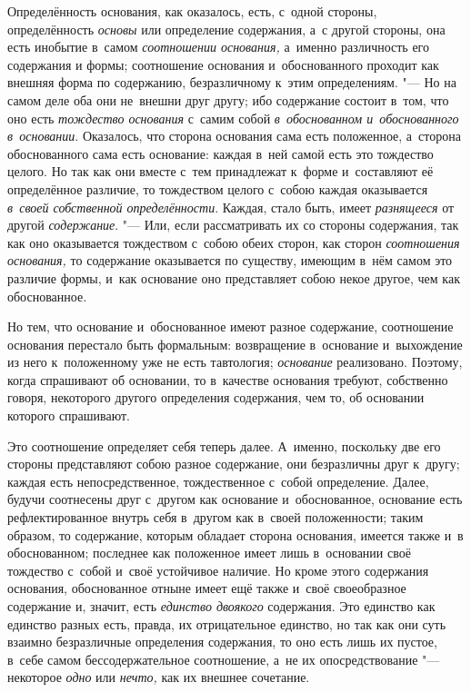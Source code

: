 
Определённость основания, как оказалось, есть, с~одной стороны, определённость
{\em основы} или определение содержания, а~с другой стороны, она есть инобытие
в~самом {\em соотношении основания,} а~именно различность его содержания и
формы; соотношение основания и~обоснованного проходит как внешняя форма по
содержанию, безразличному к~этим определениям. "--- Но на самом
деле оба они не~внешни друг другу; ибо содержание состоит
в~том, что оно есть {\em тождество основания} с~самим собой
{\em в~обоснованном и~обоснованного в~основании}. Оказалось, что сторона
основания сама есть положенное, а~сторона обоснованного сама есть основание:
каждая в~ней самой есть это тождество целого. Но так как они вместе с~тем
принадлежат к~форме и~составляют её определённое различие, то тождеством целого
с~собою каждая оказывается {\em в~своей собственной
определённости}. Каждая, стало быть,
имеет {\em разнящееся} от другой {\em содержание}. "--- Или, если рассматривать
их со стороны содержания, так как оно оказывается тождеством с~собою обеих
сторон, как сторон {\em соотношения основания,} то содержание оказывается по
существу, имеющим в~нём самом это различие формы, и~как основание оно
представляет собою некое другое, чем как обоснованное.

Но тем, что основание и~обоснованное имеют разное содержание, соотношение
основания перестало быть формальным: возвращение в~основание и~выхождение из
него к~положенному уже не есть тавтология; {\em основание} реализовано.
Поэтому, когда спрашивают об основании, то в~качестве основания требуют,
собственно говоря, некоторого другого определения содержания, чем то, об
основании которого спрашивают.

Это соотношение определяет себя теперь далее. А~именно, поскольку две его
стороны представляют собою разное содержание, они безразличны друг к~другу;
каждая есть непосредственное, тождественное с~собой определение. Далее, будучи
соотнесены друг с~другом как основание и~обоснованное, основание есть
рефлектированное внутрь себя в~другом как в~своей положенности; таким образом,
то содержание, которым обладает сторона основания, имеется также и~в
обоснованном; последнее как положенное имеет лишь в~основании своё тождество
с~собой и~своё устойчивое наличие. Но кроме этого содержания основания,
обоснованное отныне имеет ещё также и~своё своеобразное содержание и, значит,
есть {\em единство двоякого} содержания. Это единство как единство разных есть,
правда, их отрицательное единство, но так как они суть взаимно безразличные
определения содержания, то оно есть лишь их пустое, в~себе самом
бессодержательное соотношение, а~не их опосредствование "--- некоторое
{\em одно} или {\em нечто,} как их внешнее сочетание.

